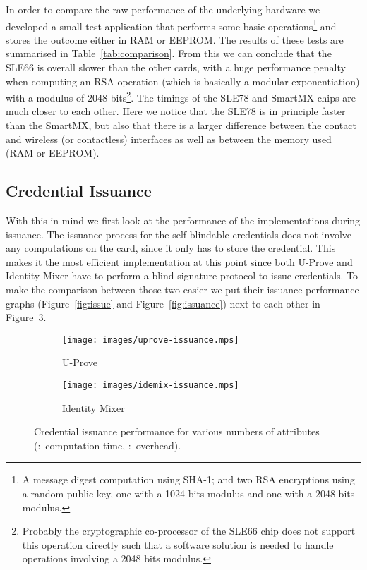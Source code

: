In order to compare the raw performance of the underlying hardware we developed
a small test application that performs some basic operations\footnote{A message
digest computation using SHA-1; and two RSA encryptions using a random public
key, one with a 1024 bits modulus and one with a 2048 bits modulus.} and stores
the outcome either in RAM or EEPROM. The results of these tests are summarised
in Table~\ref{tab:comparison}. From this we can conclude that the SLE66 is
overall slower than the other cards, with a huge performance penalty when
computing an RSA operation (which is basically a modular exponentiation) with a
modulus of 2048 bits\footnote{Probably the cryptographic co-processor of the
SLE66 chip does not support this operation directly such that a software
solution is needed to handle operations involving a 2048 bits modulus.}. The
timings of the SLE78 and SmartMX chips are much closer to each other. Here we
notice that the SLE78 is in principle faster than the SmartMX, but also that
there is a larger difference between the contact and wireless (or contactless)
interfaces as well as between the memory used (RAM or EEPROM).

\subsection{Credential Issuance}

With this in mind we first look at the performance of the implementations during
issuance. The issuance process for the self-blindable credentials does not
involve any computations on the card, since it only has to store the credential.
This makes it the most efficient implementation at this point since both U-Prove
and Identity Mixer have to perform a blind signature protocol to issue
credentials. To make the comparison between those two easier we put their
issuance performance graphs (Figure~\ref{fig:issue} and Figure~\ref{fig:issuance})
next to each other in Figure~\ref{fig:comparison-issuance}.

\begin{figure}[ht]
  \centering
  \begin{subfigure}[b]{0.45\textwidth}
  \texttt{[image: images/uprove-issuance.mps]}
    \caption{U-Prove}
    \label{fig:uprove-issuance}
  \end{subfigure}
  \begin{subfigure}[b]{0.45\textwidth}
  \texttt{[image: images/idemix-issuance.mps]}
    \caption{Identity Mixer}
    \label{fig:idemix-issuance}
  \end{subfigure}

  \caption[Credential issuance performance for various numbers of attributes.]{
    Credential issuance performance for various numbers of attributes
    (:~computation time,
      :~overhead).}
  \label{fig:comparison-issuance}
\end{figure}

